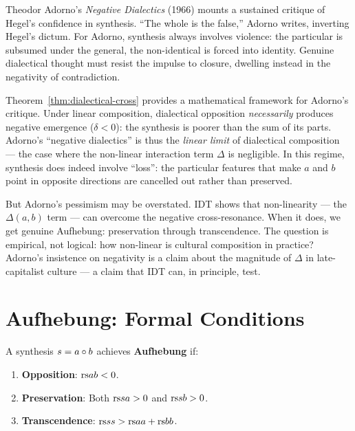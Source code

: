 \begin{interpretation}
\label{interp:ch16:adorno_negative_dialectics}
Theodor Adorno's \textit{Negative Dialectics} (1966) mounts a sustained
critique of Hegel's confidence in synthesis.  ``The whole is the false,''
Adorno writes, inverting Hegel's dictum.  For Adorno, synthesis always
involves violence: the particular is subsumed under the general, the
non-identical is forced into identity.  Genuine dialectical thought must
resist the impulse to closure, dwelling instead in the negativity of
contradiction.

Theorem~\ref{thm:dialectical-cross} provides a mathematical framework for
Adorno's critique.  Under linear composition, dialectical opposition
\emph{necessarily} produces negative emergence ($\delta < 0$): the synthesis
is poorer than the sum of its parts.  Adorno's ``negative dialectics'' is
thus the \emph{linear limit} of dialectical composition --- the case where
the non-linear interaction term $\Delta$ is negligible.  In this regime,
synthesis does indeed involve ``loss'': the particular features that make
$a$ and $b$ point in opposite directions are cancelled out rather than
preserved.

But Adorno's pessimism may be overstated.  IDT shows that non-linearity
--- the $\Delta(a,b)$ term --- can overcome the negative cross-resonance.
When it does, we get genuine Aufhebung: preservation through
transcendence.  The question is empirical, not logical: how non-linear
is cultural composition in practice?  Adorno's insistence on negativity
is a claim about the magnitude of $\Delta$ in late-capitalist culture ---
a claim that IDT can, in principle, test.
\end{interpretation}

\section{Aufhebung: Formal Conditions}

\begin{definition}[Aufhebung]
\label{def:aufhebung}
A synthesis $s = a \circ b$ achieves \textbf{Aufhebung} if:
\begin{enumerate}
\item \textbf{Opposition}: $\mathrm{rs}{a}{b} < 0$.
\item \textbf{Preservation}: Both $\mathrm{rs}{s}{a} > 0$ and $\mathrm{rs}{s}{b} > 0$.
\item \textbf{Transcendence}: $\mathrm{rs}{s}{s} > \mathrm{rs}{a}{a} + \mathrm{rs}{b}{b}$.
\end{enumerate}
\end{definition}

